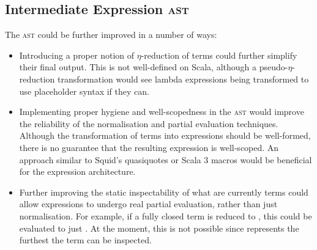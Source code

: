 \documentclass[../../main.tex]{subfiles}
\begin{document}
\subsection{Intermediate Expression \textsc{ast}}
The  \textsc{ast} could be further improved in a number of ways:
\begin{itemize}
  \item Introducing a proper notion of $\eta$-reduction of  terms could further simplify their final output. This is not well-defined on Scala, although a pseudo-$\eta$-reduction transformation would see lambda expressions being transformed to use placeholder syntax if they can.
  \item Implementing proper hygiene and well-scopedness in the  \textsc{ast} would improve the reliability of the normalisation and partial evaluation techniques. Although the transformation of terms into expressions should be well-formed, there is no guarantee that the resulting expression is well-scoped. An approach similar to Squid's quasiquotes or Scala 3 macros would be beneficial for the expression architecture.
  \item Further improving the static inspectability of what are currently  terms could allow expressions to undergo real partial evaluation, rather than just normalisation. For example, if a fully closed term is reduced to , this could be evaluated to just . At the moment, this is not possible since  represents the furthest the term can be inspected.
\end{itemize}
\end{document}

